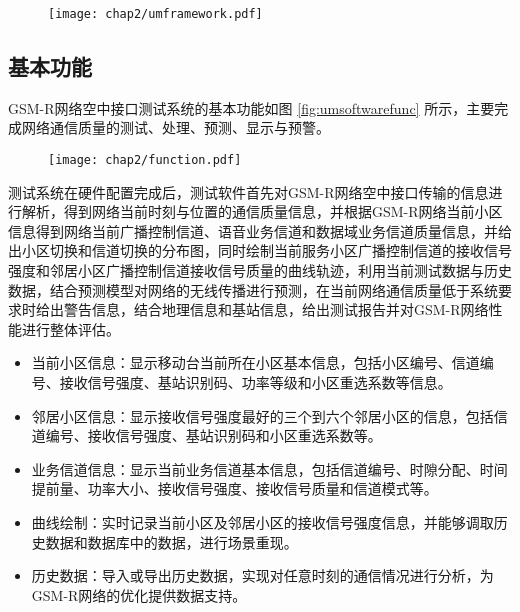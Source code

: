 \begin{figure}[!htp]
\centering
    \texttt{[image: chap2/umframework.pdf]}
\end{figure}

\subsection{基本功能}
\label{sec:function}

GSM-R网络空中接口测试系统的基本功能如图 \ref{fig:umsoftwarefunc} 所示，主要完成网络通信质量的测试、处理、预测、显示与预警。

\begin{figure}[!htp]
\centering
    \texttt{[image: chap2/function.pdf]}
\end{figure}

测试系统在硬件配置完成后，测试软件首先对GSM-R网络空中接口传输的信息进行解析，得到网络当前时刻与位置的通信质量信息，并根据GSM-R网络当前小区信息得到网络当前广播控制信道、语音业务信道和数据域业务信道质量信息，并给出小区切换和信道切换的分布图，同时绘制当前服务小区广播控制信道的接收信号强度和邻居小区广播控制信道接收信号质量的曲线轨迹，利用当前测试数据与历史数据，结合预测模型对网络的无线传播进行预测，在当前网络通信质量低于系统要求时给出警告信息，结合地理信息和基站信息，给出测试报告并对GSM-R网络性能进行整体评估。
\begin{itemize}
  \item 当前小区信息：显示移动台当前所在小区基本信息，包括小区编号、信道编号、接收信号强度、基站识别码、功率等级和小区重选系数等信息。
  \item 邻居小区信息：显示接收信号强度最好的三个到六个邻居小区的信息，包括信道编号、接收信号强度、基站识别码和小区重选系数等。
  \item 业务信道信息：显示当前业务信道基本信息，包括信道编号、时隙分配、时间提前量、功率大小、接收信号强度、接收信号质量和信道模式等。
  \item 曲线绘制：实时记录当前小区及邻居小区的接收信号强度信息，并能够调取历史数据和数据库中的数据，进行场景重现。
  \item 历史数据：导入或导出历史数据，实现对任意时刻的通信情况进行分析，为GSM-R网络的优化提供数据支持。
\end{itemize}

